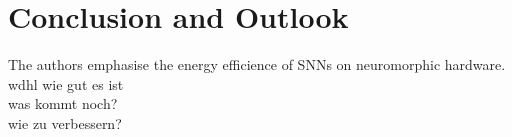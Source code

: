 \section{Conclusion and Outlook}
The authors emphasise the energy efficience of \acp{SNN} on neuromorphic hardware.
\label{sec:conclusion}
wdhl wie gut es ist\\
was kommt noch?\\
wie zu verbessern?